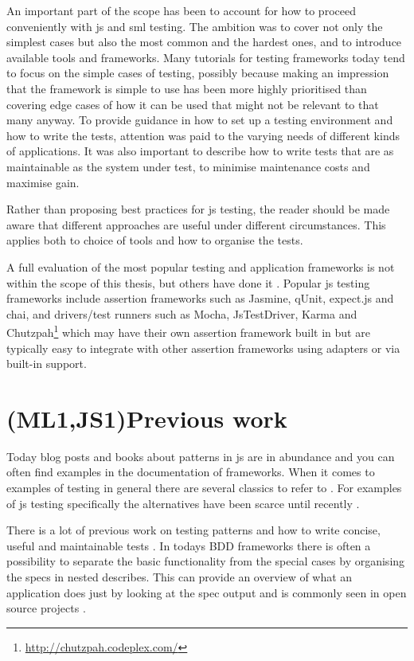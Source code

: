 \documentclass[11pt]{article}
\begin{document}
An important part of the scope has been to account for how to proceed conveniently with \gls{js} and \gls{sml} testing. The ambition was to cover not only the simplest cases but also the most common and the hardest ones, and to introduce available tools and frameworks. Many tutorials for testing frameworks today tend to focus on the simple cases of testing, possibly because making an impression that the framework is simple to use has been more highly prioritised than covering edge cases of how it can be used that might not be relevant to that many anyway. To provide guidance in how to set up a testing environment and how to write the tests, attention was paid to the varying needs of different kinds of applications. It was also important to describe how to write tests that are as maintainable as the system under test, to minimise maintenance costs and maximise gain.

Rather than proposing best practices for \gls{js} testing, the reader should be made aware that different approaches are useful under different circumstances. This applies both to choice of tools and how to organise the tests.

A full evaluation of the most popular testing and application frameworks is not within the scope of this thesis, but others have done it \cite{JackFranklin}\cite{SebastianPorto}. Popular \gls{js} testing frameworks include assertion frameworks such as Jasmine, qUnit, expect.js and chai, and drivers/test runners such as Mocha, JsTestDriver, Karma and Chutzpah\footnote{\url{http://chutzpah.codeplex.com/}} which may have their own assertion framework built in but are typically easy to integrate with other assertion frameworks using adapters or via built-in support.

\section{(ML1,JS1)Previous work}
\label{sec:previouswork}

Today blog posts and books about patterns in \gls{js} are in abundance and you can often find examples in the documentation of frameworks. When it comes to examples of testing in general there are several classics to refer to \cite{KentBeck}\cite{TestPatterns}. For examples of \gls{js} testing specifically the alternatives have been scarce until recently \cite{Tddjs}\cite{BDDJS}\cite{TestableJS}\cite{JasmineBook}\cite{JSUT}.

There is a lot of previous work on testing patterns and how to write concise, useful and maintainable tests \cite[part~III]{TestPatterns}\cite[ch.~3-5]{BDDJS}\cite[p.~461-474]{Tddjs}\cite[p.~86-87]{TestableJS}\cite[p.~13-14]{JasmineBook}. In todays BDD frameworks there is often a possibility to separate the basic functionality from the special cases by organising the \glspl{spec} in nested describes. This can provide an overview of what an application does just by looking at the \gls{spec} output and is commonly seen in open source projects \cite[question~42]{Stenmark}.
\end{document}
